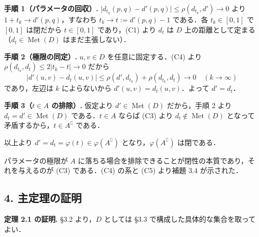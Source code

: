 \documentclass[
  lualatex,ja=standard]{bxjsarticle}
\begin{document}
\textbf{手順 1（パラメータの回収）.}
\(\lvert d_{t_k}(p,q) - d'(p,q)\rvert \le \rho(d_{t_k}, d') \to 0\) より
\(1 + t_k \to d'(p,q)\)，すなわち \(t_k \to t := d'(p,q) - 1\)
である．各 \(t_k \in [0,1]\) で \([0,1]\) は閉だから \(t \in [0,1]\)
であり，(C1) より \(d_t\) は \(D\)
上の距離として定まる（\(d_t \in \operatorname{Met}(D)\)
はまだ主張しない）．

\textbf{手順 2（極限の同定）.} \(u, v \in D\) を任意に固定する．(C4)
より \(\rho(d_{t_k}, d_t) \le 2\lvert t_k - t\rvert \to 0\) だから
\[\lvert d'(u,v) - d_t(u,v)\rvert \le \rho(d', d_{t_k}) + \rho(d_{t_k}, d_t) \longrightarrow 0 \quad (k \to \infty)\]
であり，左辺は \(k\) によらないから \(d'(u,v) = d_t(u,v)\)．よって
\(d' = d_t\)．

\textbf{手順 3（\(t \in A\) の排除）.} 仮定より
\(d' \in \operatorname{Met}(D)\) だから，手順 2 より
\(d_t = d' \in \operatorname{Met}(D)\) である．\(t \in A\) ならば (C3)
より \(d_t \notin \operatorname{Met}(D)\)
となって矛盾するから，\(t \in A^\complement\) である．

以上より \(d' = d_t = \varphi(t) \in \varphi(A^\complement)\)
となり，\(\varphi(A^\complement)\) は閉である．

パラメータの極限が \(A\)
に落ちる場合を排除できることが閉性の本質であり，それを与えるのが (C3)
である．(C4) の系と (C5) より補題 3.4 が示された．

\hypertarget{ux4e3bux5b9aux7406ux306eux8a3cux660e}{%
\subsection{4.
主定理の証明}\label{ux4e3bux5b9aux7406ux306eux8a3cux660e}}

\textbf{定理 2.1 の証明.} §3.2 より，\(D\) としては §3.3
で構成した具体的な集合を取ってよい．
\end{document}

